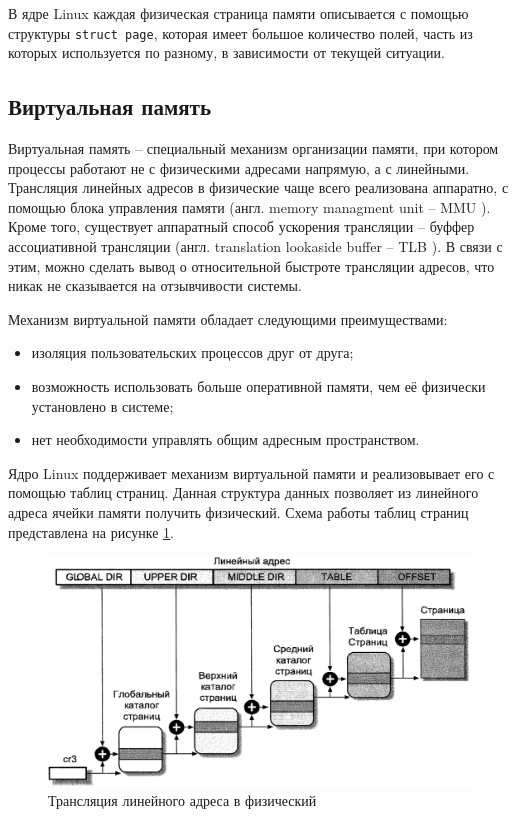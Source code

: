 В ядре Linux каждая физическая страница памяти описывается с помощью структуры \texttt{struct page}, которая имеет большое количество полей, часть из которых используется по разному, в зависимости от текущей ситуации. 

\subsection{Виртуальная память}

Виртуальная память -- специальный механизм организации памяти, при котором процессы работают не с физическими адресами напрямую, а с линейными. Трансляция линейных адресов в физические чаще всего реализована аппаратно, с помощью блока управления памяти (англ. memory managment unit -- MMU \cite{mmu}). Кроме того, существует аппаратный способ ускорения трансляции -- буффер ассоциативной трансляции (англ. translation lookaside buffer -- TLB \cite{tlb}). В связи с этим, можно сделать вывод о относительной быстроте трансляции адресов, что никак не сказывается на отзывчивости системы.

Механизм виртуальной памяти обладает следующими преимуществами:

\begin{itemize}
	\item изоляция пользовательских процессов друг от друга;
	\item возможность использовать больше оперативной памяти, чем её физически установлено в системе;
	\item нет необходимости управлять общим адресным пространством.
\end{itemize}

Ядро Linux поддерживает механизм виртуальной памяти и реализовывает его с помощью таблиц страниц. Данная структура данных позволяет из линейного адреса ячейки памяти получить физический. Схема работы таблиц страниц представлена на рисунке \ref{fig:tables}.

\begin{figure}[h]
	\centering
	\includegraphics[width=\textwidth]{img/tables.png}
	\caption{Трансляция линейного адреса в физический}
	\label{fig:tables}
\end{figure}

